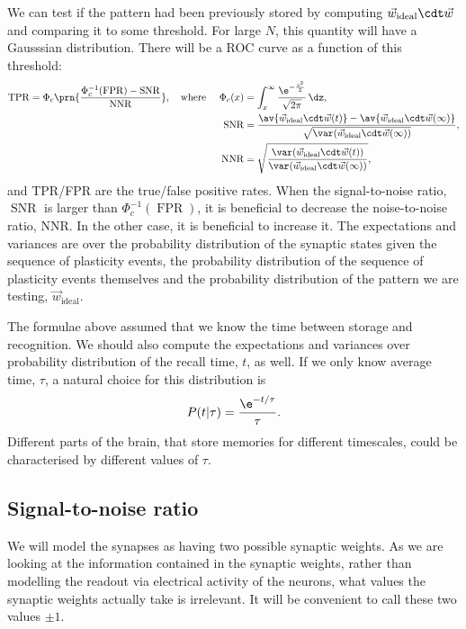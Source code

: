 \documentclass[12pt]{article}
\newcommand{\inv}{^{-1}}
\newcommand{\syn}{\vec{w}}
\newcommand{\synid}{\syn_\text{ideal}}
\DeclareMathOperator{\snr}{SNR}
\begin{document}
We can test if the pattern had been previously stored by computing $\synid\cdt\syn$ and comparing it to some threshold.
For large $N$, this quantity will have a Gausssian distribution.
There will be a ROC curve as a function of this threshold:
%
\begin{equation}\label{eq:ROC}
  \begin{aligned}
  \operatorname{TPR} &= \Phi_c \prn{ \frac{ \Phi_c\inv(\operatorname{FPR}) - \snr }{ \operatorname{NNR} } },
  \quad\text{where } &
    \Phi_c(x) &= \int_x^\infty \frac{ \e^{-\frac{z^2}{2}} }{ \sqrt{2\pi} }\, \dz, \\&&
    \snr &= \frac{ \av{\synid\cdt\syn(t)} - \av{\synid\cdt\syn(\infty)} }{ \sqrt{\var(\synid\cdt\syn(\infty))}}, \\&&
    \operatorname{NNR} &= \sqrt{\frac{ \var(\synid\cdt\syn(t)) }{ \var(\synid\cdt\syn(\infty)) }},
  \end{aligned}
\end{equation}
%
and TPR/FPR are the true/false positive rates.
When the signal-to-noise ratio, $\snr$ is larger than $\Phi_c\inv(\operatorname{FPR})$, it is beneficial to decrease the noise-to-noise ratio, NNR.
In the other case, it is beneficial to increase it.
The expectations and variances are over the probability distribution of the synaptic states given the sequence of plasticity events, the probability distribution of the sequence of plasticity events themselves and the probability distribution of the pattern we are testing, $\synid$.

The formulae above assumed that we know the time between storage and recognition.
We should also compute the expectations and variances over probability distribution of the recall time, $t$, as well.
If we only know average time, $\tau$, a natural choice for this distribution is
%
\begin{equation}\label{eq:recogtime}
  P(t\vert\tau) = \frac{\e^{-t/\tau}}{\tau}.
\end{equation}
%
Different parts of the brain, that store memories for different timescales, could be characterised by different values of $\tau$.


\subsection{Signal-to-noise ratio}\label{sec:snr}

We will model the synapses as having two possible synaptic weights.
As we are looking at the information contained in the synaptic weights, rather than modelling the readout via electrical activity of the neurons, what values the synaptic weights actually take is irrelevant.
It will be convenient to call these two values $\pm1$.
\end{document}
